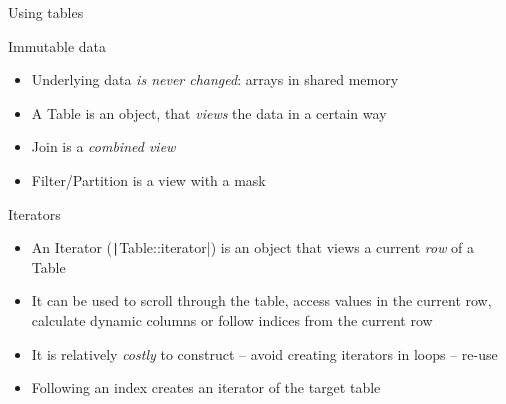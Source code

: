 \documentclass[10pt,lualatex,xcolor={table,svgnames},{hyperref={bookmarks=true,linktoc=all}},aspectratio=169]{beamer}
\newcommand{\programmatic}[1]{\textcolor{-green!40!yellow}{#1}}
\newcommand{\codeline}[1]{{\texttt|#1|}}
\begin{document}
\begin{frame}{Using tables}
    \begin{block}{Immutable data}
        \begin{itemize}
            \item Underlying data \emph{is never changed}: arrays in shared memory
            \item A \programmatic{Table} is an object, that \emph{views} the data in a certain way
            \item \programmatic{Join} is a \emph{combined view}
            \item \programmatic{Filter/Partition} is a view with a mask
        \end{itemize}
    \end{block}
    \vspace{1.5ex}
    \begin{block}{Iterators}
        \begin{itemize}
            \item An \programmatic{Iterator} (\codeline{Table::iterator}) is an object that views a current \emph{row} of a \programmatic{Table}
            \item It can be used to scroll through the table, access values in the current row, calculate dynamic columns or follow indices from the current row
            \item It is relatively \emph{costly} to construct -- avoid creating iterators in loops -- re-use
            \item Following an index creates an iterator of the target table
        \end{itemize}
    \vspace{0.5ex}
    \end{block}
\end{frame}
\end{document}
